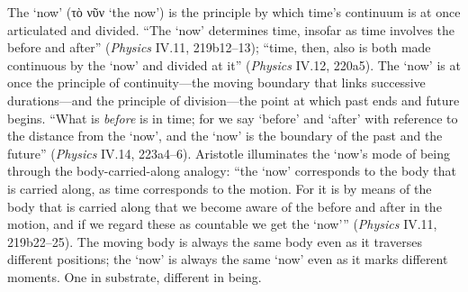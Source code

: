 \documentclass{article}
\newcommand{\gk}[1]{{\greekfont #1}}
\begin{document}
The `now' (\gk{τὸ νῦν} `the now') is the principle by which time's continuum is at once articulated and divided. ``The `now' determines time, insofar as time involves the before and after'' (\textit{Physics} IV.11, 219b12--13); ``time, then, also is both made continuous by the `now' and divided at it'' (\textit{Physics} IV.12, 220a5). The `now' is at once the principle of continuity---the moving boundary that links successive durations---and the principle of division---the point at which past ends and future begins. ``What is \textit{before} is in time; for we say `before' and `after' with reference to the distance from the `now', and the `now' is the boundary of the past and the future'' (\textit{Physics} IV.14, 223a4--6). Aristotle illuminates the `now's mode of being through the body-carried-along analogy: ``the `now' corresponds to the body that is carried along, as time corresponds to the motion. For it is by means of the body that is carried along that we become aware of the before and after in the motion, and if we regard these as countable we get the `now''' (\textit{Physics} IV.11, 219b22--25). The moving body is always the same body even as it traverses different positions; the `now' is always the same `now' even as it marks different moments. One in substrate, different in being.
\end{document}
